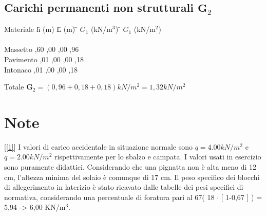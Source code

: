 \documentclass[a4paper,12pt, oneside]{book}
\begin{document}
    \section{Carichi permanenti non strutturali $\textbf{G}_2$}
    
    \begin{tabbing}
    	Materiale\hspace{2em} \= h (m)\hspace{3em} \= L (m)\hspace{3em} \= $G_1$ (kN/m$^3$)\hspace{3em} \= $G_1$ (kN/m$^2$)\hspace{1em}\\\\
    	Massetto  ,60 ,00 ,00           ,96  \\
    	Pavimento ,01 ,00 ,00           ,18  \\ 
    	Intonaco  ,01 ,00 ,00           ,18                                    
    \end{tabbing}	    
    
    Totale $\textbf{G}_2=(0,96+0,18+0,18)kN/m^2=1,32kN/m^2$ 
    
	\chapter{Note}
	[\ref{1}] I valori di carico accidentale in situazione normale sono $q=4.00kN/m^{2}$ e $q=2.00kN/m^{2}$ rispettivamente per lo sbalzo e campata. I valori usati in esercizio sono puramente didattici.
	\leavevmode\newline
	\leavevmode\newline
	[\ref{2}] Considerando che una pignatta non è alta meno di 12 cm, l’altezza minima del solaio è comunque di 17 cm.
	\leavevmode\newline
	\leavevmode\newline
	[\ref{3}] Il peso specifico dei blocchi di allegerimento in laterizio è stato ricavato dalle tabelle dei pesi specifici di normativa, considerando una percentuale di foratura pari al 67\textdiscount ( 18 $\cdot$ [ 1-0,67 ] ) = 5,94 -> 6,00 KN/m$^3$.
	
\end{document}
